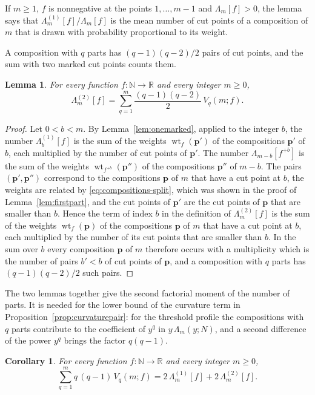 \documentclass{amsart}
\newtheorem{lemma}[theorem]{Lemma}
\newtheorem{corollary}[theorem]{Corollary}
\theoremstyle{definition}
\theoremstyle{remark}
\numberwithin{equation}{section}
\begin{document}
If $m\ge1$, $f$ is nonnegative at the points $1,\dots,m-1$ and
$\Lambda_m[f]>0$, the lemma
says that $\Lambda^{(1)}_m[f]/\Lambda_m[f]$ is the mean number of cut points
of a composition of $m$ that is drawn with probability proportional to its
weight.

A composition with $q$ parts has $(q-1)(q-2)/2$ pairs of cut points, and the
sum with two marked cut points counts them.

\begin{lemma}\label{lem:twomarked}
For every function $f\colon\mathbb N\to\mathbb R$ and every integer $m\ge0$,
\[
\Lambda^{(2)}_m[f]=\sum_{q=1}^{m}\frac{(q-1)(q-2)}{2}\,V_q(m;f).
\]
\end{lemma}

\begin{proof}
Let $0<b<m$. By Lemma~\ref{lem:onemarked}, applied to the integer $b$, the
number $\Lambda^{(1)}_b[f]$ is the sum of the weights
$\operatorname{wt}_f(\mathbf p')$ of the compositions $\mathbf p'$ of $b$, each multiplied
by the number of cut points of $\mathbf p'$. The number $\Lambda_{m-b}[f^{+b}]$ is
the sum of the weights $\operatorname{wt}_{f^{+b}}(\mathbf p'')$ of the compositions
$\mathbf p''$ of $m-b$. The pairs $(\mathbf p',\mathbf p'')$ correspond to the compositions $\mathbf p$ of
$m$ that have a cut point at $b$, the weights are related by
\eqref{eq:compositions-split}, which was shown in the proof of
Lemma~\ref{lem:firstpart}, and the cut points of $\mathbf p'$ are the cut points
of $\mathbf p$ that are smaller than $b$. Hence the term of index $b$ in the
definition of $\Lambda^{(2)}_m[f]$ is the sum of the weights
$\operatorname{wt}_f(\mathbf p)$ of the compositions $\mathbf p$ of $m$ that have a cut
point at $b$, each multiplied by the number of its cut points that are
smaller than $b$. In the sum over $b$ every composition $\mathbf p$ of $m$ therefore
occurs with a multiplicity which is the number of pairs $b'<b$ of cut points
of $\mathbf p$, and a composition with $q$ parts has $(q-1)(q-2)/2$ such pairs.
\end{proof}

The two lemmas together give the second factorial moment of the number of
parts. It is needed for the lower bound of the curvature term in
Proposition~\ref{prop:curvaturepair}: for the threshold profile the
compositions with $q$ parts contribute to the coefficient of $y^{q}$ in
$y\,\Lambda_m(y;N)$, and a second difference of the power $y^{q}$ brings
the factor $q(q-1)$.

\begin{corollary}\label{cor:partsmoment}
For every function $f\colon\mathbb N\to\mathbb R$ and every integer $m\ge0$,
\[
\sum_{q=1}^{m}q\,(q-1)\,V_q(m;f)=2\,\Lambda^{(1)}_m[f]+2\,\Lambda^{(2)}_m[f].
\]
\end{corollary}
\end{document}
